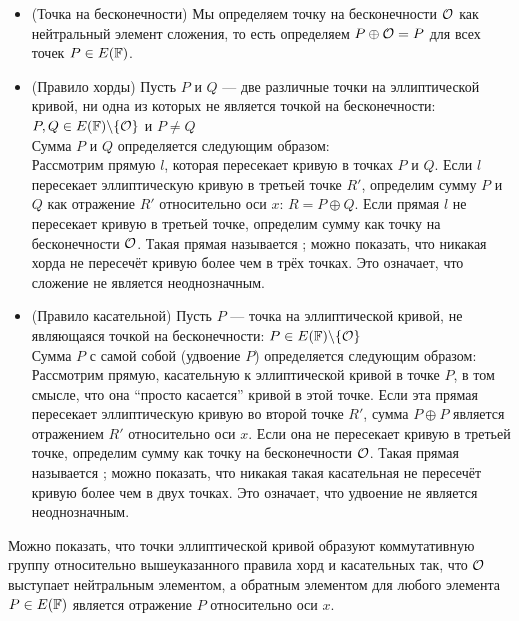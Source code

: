\begin{definition}\label{def:chord-and-tangent}


\begin{itemize}
\item (Точка на бесконечности) Мы определяем точку на бесконечности $\mathcal{O}$ как нейтральный элемент сложения, то есть определяем $P\oplus\mathcal{O} = P$ для всех точек $P\in E(\mathbb{F})$.
\item (Правило хорды) Пусть $P$ и $Q$ — две различные точки на эллиптической кривой, ни одна из которых не является точкой на бесконечности: $P, Q\in E(\mathbb{F})\backslash \{\mathcal{O}\}$ и $P\neq Q$\\
Сумма $P$ и $Q$ определяется следующим образом:\\
Рассмотрим прямую $l$, которая пересекает кривую в точках $P$ и $Q$. Если $l$ пересекает эллиптическую кривую в третьей точке $R'$, определим сумму $P$ и $Q$ как отражение $R'$ относительно оси $x$: $R=P\oplus Q$. Если прямая $l$ не пересекает кривую в третьей точке, определим сумму как точку на бесконечности $\mathcal{O}$. Такая прямая называется ; можно показать, что никакая хорда не пересечёт кривую более чем в трёх точках. Это означает, что сложение не является неоднозначным.
\item (Правило касательной) Пусть $P$ — точка на эллиптической кривой, не являющаяся точкой на бесконечности: $P \in E(\mathbb{F})\backslash \{\mathcal{O}\}$\\
 Сумма $P$ с самой собой (удвоение $P$) определяется следующим образом:\\
Рассмотрим прямую, касательную к эллиптической кривой в точке $P$, в том смысле, что она ``просто касается'' кривой в этой точке. Если эта прямая пересекает эллиптическую кривую во второй точке $R'$, сумма $P\oplus P$ является отражением $R'$ относительно оси $x$. Если она не пересекает кривую в третьей точке, определим сумму как точку на бесконечности $\mathcal{O}$. Такая прямая называется ; можно показать, что никакая такая касательная не пересечёт кривую более чем в двух точках. Это означает, что удвоение не является неоднозначным.
\end{itemize}
\end{definition}

Можно показать, что точки эллиптической кривой образуют коммутативную группу относительно вышеуказанного правила хорд и касательных так, что $\mathcal{O}$ выступает нейтральным элементом, а обратным элементом для любого элемента $P\in E(\mathbb{F})$ является отражение $P$ относительно оси $x$. 

